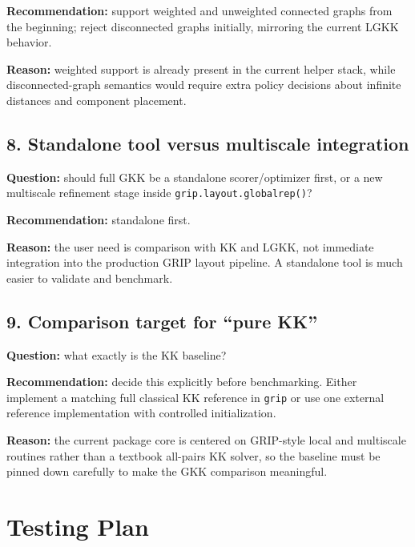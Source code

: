\documentclass[11pt]{article}
\begin{document}
\textbf{Recommendation:} support weighted and unweighted connected graphs from
the beginning; reject disconnected graphs initially, mirroring the current LGKK
behavior.

\textbf{Reason:} weighted support is already present in the current helper stack,
while disconnected-graph semantics would require extra policy decisions about
infinite distances and component placement.

\subsection*{8. Standalone tool versus multiscale integration}

\textbf{Question:} should full GKK be a standalone scorer/optimizer first, or a
new multiscale refinement stage inside \texttt{grip.layout.globalrep()}?

\textbf{Recommendation:} standalone first.

\textbf{Reason:} the user need is comparison with KK and LGKK, not immediate
integration into the production GRIP layout pipeline. A standalone tool is much
easier to validate and benchmark.

\subsection*{9. Comparison target for ``pure KK''}

\textbf{Question:} what exactly is the KK baseline?

\textbf{Recommendation:} decide this explicitly before benchmarking. Either
implement a matching full classical KK reference in \texttt{grip} or use one
external reference implementation with controlled initialization.

\textbf{Reason:} the current package core is centered on GRIP-style local and
multiscale routines rather than a textbook all-pairs KK solver, so the baseline
must be pinned down carefully to make the GKK comparison meaningful.

\section{Testing Plan}
\end{document}
